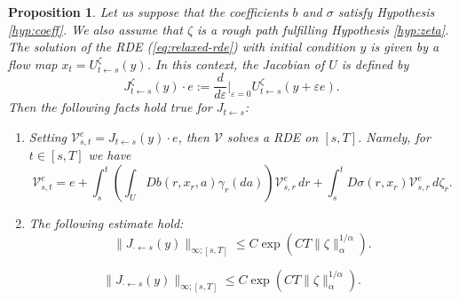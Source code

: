 \documentclass[10pt,a4paper]{amsart}
\newtheorem{proposition}{Proposition}
\newcommand{\al}{\alpha}
\begin{document}
\begin{proposition}\label{prop: Flow and Jacobian}
    Let us suppose that the coefficients $b$ and $\sigma$ satisfy Hypothesis \ref{hyp:coeff}. We also assume that $\zeta$ is a rough path fulfilling Hypothesis \ref{hyp:zeta}. The solution of the RDE (\ref{eq:relaxed-rde}) with initial condition $y$ is given by a flow map $x_{t}=U_{t\leftarrow s}^{\zeta}(y)$. In this context, the Jacobian of $U$ is defined by
    \[J_{t\leftarrow s}^{\zeta}(y)\cdot e := \frac{d}{d\varepsilon}\bigg|_{\varepsilon=0}U_{t\leftarrow s}^{\zeta}(y+\varepsilon e) .\]
    Then the following facts hold true for $J_{t\leftarrow s}$:
\begin{enumerate}[wide, labelwidth=!, labelindent=0pt, label=\textnormal{(\roman*)}]
\setlength\itemsep{.1in}    

\item Setting $\mathcal{V}_{s,t}^{e}=J_{t\leftarrow s}(y)\cdot e$, then $\mathcal{V}$ solves a RDE on $[s,T]$. Namely, for $t\in [s,T]$ we have 
    \begin{equation}\label{eq: Jacobian-RDE}
        \mathcal{V}_{s,t}^{e}=e + \int_{s}^{t}\left(\int_{U}Db(r,x_{r},a)\gamma_{r}(da) \right) \mathcal{V}_{s,r}^{e}\,dr +\int_{s}^{t}D\sigma (r,x_{r})\mathcal{V}_{s,r}^{e}\, d\zeta_{r}.
    \end{equation}


  \item The following estimate hold:
    \begin{equation} \label{ineq: Jacob}
        \|J_{\cdot \leftarrow s}(y)\|_{\infty;[s,T]}\leq C\exp{(CT\|\zeta\|_{\alpha}^{1/\al})} . \end{equation}
      \end{enumerate}
\end{proposition}

    \begin{equation} 
        \|J_{\cdot \leftarrow s}(y)\|_{\infty;[s,T]}\leq C\exp{(CT\|\zeta\|_{\alpha}^{1/\al})} . \end{equation}
\end{document}
